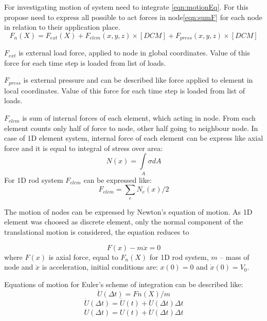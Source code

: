 \documentclass[12pt]{report}
\begin{document}
For investigating motion of system need to integrate \eqref{eqn:motionEq}. For
this propose need to express all possible to act forces in node\eqref{eqn:sumF}
for each node in relation to their application place. 
\begin{equation}\label{eqn:sumF}
   F_n(X)=
   F_{ext}(X)+
   F_{elem}(x, y, z)\times[DCM]+
   F_{press}(x, y, z)\times[DCM]
\end{equation}\par
$F_{ext}$ is external load force, applied to node in global coordinates. Value
of this force for each time step is loaded from list of loads.\par $F_{press}$
is external pressure and can be described like force applied to element in local
coordinates. Value of this force for each time step is loaded from list of
loads.\par $F_{elem}$ is sum of internal forces of each element, which acting in
node. From each element counts only half of force to node, other half going to
neighbour node. In case of 1D element system, internal force of each element can
be express like axial force and it is equal to integral of stress over area:
\begin{equation}\label{eqn:Nx}
  N(x)= \int\limits_A \sigma dA
\end{equation}
For 1D rod system $F_{elem}$ can be expressed like:
\begin{equation}\label{eqn:Felem}
  F_{elem}= \sum_{e}N_e(x)/2
\end{equation}\par
The motion of nodes can be expressed by Newton's equation of motion. As 1D
element was choosed as discrete element, only the normal component of the
translational motion is considered, the equation reduces to\par
\begin{equation}\label{eqn:motionEq}
   F(x)-m\ddot{x}=0
\end{equation}
where $F(x)$ is axial force, equal to $F_n(X)$ for 1D rod system, $m$ – mass of
node and $\ddot{x}$ is acceleration, initial conditions are: $x(0)=0$ and
$\dot{x}(0)=V_0$.\par Equations of motion for Euler's scheme of integration can
be described like:
\begin{equation}\label{eqn:Accel}
  \ddot{U}(\Delta t)=Fn(X)/m
\end{equation}
\begin{equation}\label{eqn:Velos}
  \dot{U}(\Delta t)=\dot{U}(t)+\ddot{U}(\Delta t)\Delta t
\end{equation}
\begin{equation}\label{eqn:Displ}
  U(\Delta t)=U(t)+\dot{U}(\Delta t)\Delta t
\end{equation}
\end{document}
